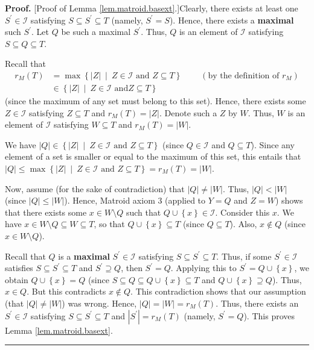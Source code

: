 \documentclass[numbers=enddot,12pt,final,onecolumn,notitlepage]{scrartcl}%
\theoremstyle{definition}
\newenvironment{proof}[1][Proof]{\noindent\textbf{#1.} }{\ \rule{0.5em}{0.5em}}
\begin{document}
\begin{proof}
[Proof of Lemma \ref{lem.matroid.basext}.]Clearly, there exists at least one
$S^{\prime}\in\mathcal{I}$ satisfying $S\subseteq S^{\prime}\subseteq T$
(namely, $S^{\prime}=S$). Hence, there exists a \textbf{maximal} such
$S^{\prime}$. Let $Q$ be such a maximal $S^{\prime}$. Thus, $Q$ is an element
of $\mathcal{I}$ satisfying $S\subseteq Q\subseteq T$.

Recall that
\begin{align*}
r_{M}\left(  T\right)   &  =\max\left\{  \left\vert Z\right\vert \ \mid
\ Z\in\mathcal{I}\text{ and }Z\subseteq T\right\}  \ \ \ \ \ \ \ \ \ \ \left(
\text{by the definition of }r_{M}\right) \\
&  \in\left\{  \left\vert Z\right\vert \ \mid\ Z\in\mathcal{I}\text{ and
}Z\subseteq T\right\}
\end{align*}
(since the maximum of any set must belong to this set). Hence, there exists
some $Z\in\mathcal{I}$ satisfying $Z\subseteq T$ and $r_{M}\left(  T\right)
=\left\vert Z\right\vert $. Denote such a $Z$ by $W$. Thus, $W$ is an element
of $\mathcal{I}$ satisfying $W\subseteq T$ and $r_{M}\left(  T\right)
=\left\vert W\right\vert $.

We have $\left\vert Q\right\vert \in\left\{  \left\vert Z\right\vert
\ \mid\ Z\in\mathcal{I}\text{ and }Z\subseteq T\right\}  $ (since
$Q\in\mathcal{I}$ and $Q\subseteq T$). Since any element of a set is smaller
or equal to the maximum of this set, this entails that $\left\vert
Q\right\vert \leq\max\left\{  \left\vert Z\right\vert \ \mid\ Z\in
\mathcal{I}\text{ and }Z\subseteq T\right\}  =r_{M}\left(  T\right)
=\left\vert W\right\vert $.

Now, assume (for the sake of contradiction) that $\left\vert Q\right\vert
\neq\left\vert W\right\vert $. Thus, $\left\vert Q\right\vert <\left\vert
W\right\vert $ (since $\left\vert Q\right\vert \leq\left\vert W\right\vert $).
Hence, Matroid axiom 3 (applied to $Y=Q$ and $Z=W$) shows that there exists
some $x\in W\setminus Q$ such that $Q\cup\left\{  x\right\}  \in\mathcal{I}$.
Consider this $x$. We have $x\in W\setminus Q\subseteq W\subseteq T$, so that
$Q\cup\left\{  x\right\}  \subseteq T$ (since $Q\subseteq T$). Also, $x\notin
Q$ (since $x\in W\setminus Q$).

Recall that $Q$ is a \textbf{maximal} $S^{\prime}\in\mathcal{I}$ satisfying
$S\subseteq S^{\prime}\subseteq T$. Thus, if some $S^{\prime}\in\mathcal{I}$
satisfies $S\subseteq S^{\prime}\subseteq T$ and $S^{\prime}\supseteq Q$, then
$S^{\prime}=Q$. Applying this to $S^{\prime}=Q\cup\left\{  x\right\}  $, we
obtain $Q\cup\left\{  x\right\}  =Q$ (since $S\subseteq Q\subseteq
Q\cup\left\{  x\right\}  \subseteq T$ and $Q\cup\left\{  x\right\}  \supseteq
Q$). Thus, $x\in Q$. But this contradicts $x\notin Q$. This contradiction
shows that our assumption (that $\left\vert Q\right\vert \neq\left\vert
W\right\vert $) was wrong. Hence, $\left\vert Q\right\vert =\left\vert
W\right\vert =r_{M}\left(  T\right)  $. Thus, there exists an $S^{\prime}%
\in\mathcal{I}$ satisfying $S\subseteq S^{\prime}\subseteq T$ and $\left\vert
S^{\prime}\right\vert =r_{M}\left(  T\right)  $ (namely, $S^{\prime}=Q$). This
proves Lemma \ref{lem.matroid.basext}.
\end{proof}
\end{document}
